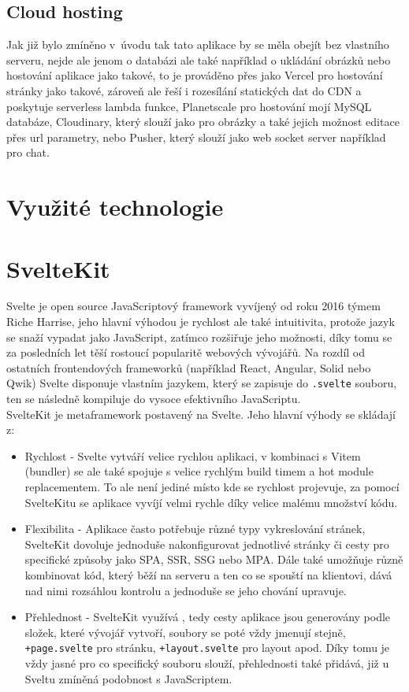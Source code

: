 \documentclass[12pt, a4paper,
openright
]{report}
\begin{document}
\subsection{Cloud hosting}
Jak již bylo zmíněno v~úvodu tak tato aplikace by se měla obejít bez vlastního serveru, nejde ale jenom o databázi ale také například o ukládání obrázků nebo hostování aplikace jako takové, to je prováděno přes  jako Vercel pro hostování stránky jako takové, zároveň ale řeší i rozesílání statických dat do CDN a poskytuje serverless lambda funkce, Planetscale pro hostování mojí MySQL databáze, Cloudinary, který slouží jako  pro obrázky a také jejich možnost editace přes url parametry, nebo Pusher, který slouží jako web socket server například pro chat.

\section{Využité technologie}

\section{SvelteKit}

Svelte je open source JavaScriptový framework vyvíjený od roku 2016 týmem Riche Harrise, jeho hlavní výhodou je rychlost ale také intuitivita, protože jazyk se snaží vypadat jako JavaScript, zatímco rozšiřuje jeho možnosti, díky tomu se za posledních let těší rostoucí popularitě webových vývojářů. Na rozdíl od ostatních frontendových frameworků (například React, Angular, Solid nebo Qwik) Svelte disponuje vlastním jazykem, který se zapisuje do \texttt{.svelte} souboru, ten se následně kompiluje do vysoce efektivního JavaScriptu.\\

SvelteKit je metaframework postavený na Svelte. Jeho hlavní výhody se skládají z:
\begin{itemize}
	\item Rychlost - Svelte vytváří velice rychlou aplikaci, v kombinaci s Vitem (bundler) se ale také spojuje s velice rychlým build timem a hot module replacementem. To ale není jediné místo kde se rychlost projevuje, za pomocí SvelteKitu se aplikace vyvíjí velmi rychle díky velice malému množství  kódu.
	\item Flexibilita - Aplikace často potřebuje různé typy vykreslování stránek, SvelteKit dovoluje jednoduše nakonfigurovat jednotlivé stránky či cesty pro specifické způsoby jako SPA, SSR, SSG nebo MPA. Dále také umožňuje různě kombinovat kód, který běží na serveru a ten co se spouští na klientovi, dává nad nimi rozsáhlou kontrolu a jednoduše se jeho chování upravuje.
	\item Přehlednost - SvelteKit využívá , tedy cesty aplikace jsou generovány podle složek, které vývojář vytvoří, soubory se poté vždy jmenují stejně, \texttt{+page.svelte} pro stránku, \texttt{+layout.svelte} pro layout apod. Díky tomu je vždy jasné pro co specifický souboru slouží, přehlednosti také přidává, již u Sveltu zmíněná podobnost s JavaScriptem.
\end{itemize} 
\end{document}
